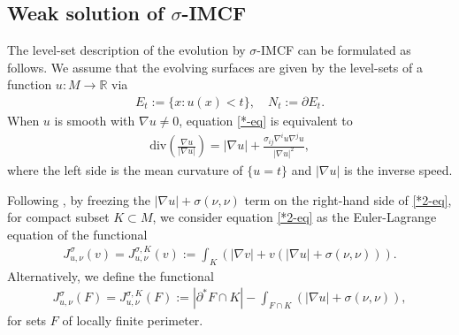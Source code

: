 \documentclass[11pt,letterpaper]{amsart}
\theoremstyle{definition}
\theoremstyle{remark}
\begin{document}
\subsection{Weak solution of $\sigma $-IMCF}
The level-set description of the evolution by $\sigma $-IMCF can be formulated as follows. We assume that the evolving surfaces are given by the level-sets of a function $u: M \to \mathbb{R}$ via
\begin{align*}
	E_t:= \{ x: u(x) <t\} ,\quad N_t := \partial E_t. 
\end{align*}
When $u$ is smooth with $\nabla u \neq 0$, equation \ref{*-eq} is equivalent to 
\begin{align}\label{*2-eq}
	\mathrm{div}\left( \frac{\nabla u}{|\nabla u|} \right) = |\nabla u| + \frac{\sigma _{ij} \nabla ^{i} u \nabla ^{j}u}{|\nabla u|^2}, \tag*{$(* *)$}
\end{align}
where the left side is the mean curvature of $\{ u = t\} $ and $|\nabla u|$ is the inverse speed.

Following \cite[Section 4]{Dong26SigmaIMCF}, by freezing the $|\nabla u| + \sigma (\nu ,\nu )$ term on the right-hand side of \ref{*2-eq}, for compact subset $K \subset M$, we consider equation \ref{*2-eq} as the Euler-Lagrange equation of the functional
\begin{align*}
	J_{u, \nu }^{\sigma }(v) = J_{u, \nu }^{\sigma ,K}(v) := \int_{K}\left( |\nabla v| + v (|\nabla u| + \sigma (\nu ,\nu )) \right).
\end{align*} 
Alternatively, we define the functional
\begin{align*}
	J_{u, \nu }^{\sigma }(F) = J_{u, \nu }^{\sigma ,K}(F):= |\partial ^* F \cap K| - \int_{F \cap K} \left( |\nabla u| + \sigma (\nu ,\nu ) \right) ,
\end{align*} 
for sets $F$ of locally finite perimeter.
\end{document}
